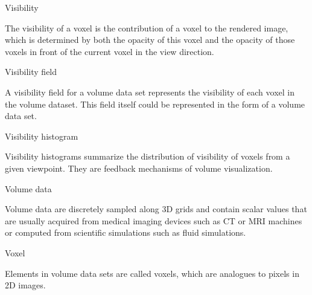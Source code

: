 \documentclass[a4paper, 12pt, twoside, openright]{report}         %
\begin{document}
\begin{description}
\item Visibility

The visibility of a voxel is the contribution of a voxel to the rendered image, which is determined by both the opacity of this voxel and the opacity of those voxels in front of the current voxel in the view direction.

\item Visibility field

A visibility field for a volume data set represents the visibility of each voxel in the volume dataset. This field itself could be represented in the form of a volume data set.

\item Visibility histogram

Visibility histograms summarize the distribution of visibility of voxels from a given viewpoint. They are feedback mechanisms of volume visualization.

\item Volume data

Volume data are discretely sampled along 3D grids and contain scalar values that are usually acquired from medical imaging devices such as CT or MRI machines or computed from scientific simulations such as fluid simulations.

\item Voxel

Elements in volume data sets are called voxels, which are analogues to pixels in 2D images.

\end{description}

\cleardoublepage

                                
                                





%

\begin{appendix}



\end{appendix}






\end{document}
